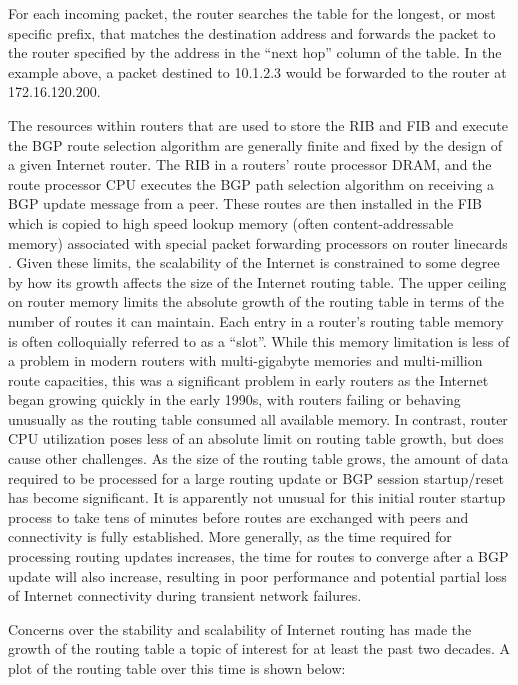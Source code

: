 For each incoming packet, the router searches the table for the longest, or
most specific prefix, that matches the destination address and forwards the
packet to the router specified by the address in the ``next hop'' column of the
table. In the example above, a packet destined to 10.1.2.3 would be forwarded
to the router at 172.16.120.200.

The resources within routers that are used to store the RIB and FIB and execute
the BGP route selection algorithm are generally finite and fixed by the design
of a given Internet router. The RIB in a routers' route processor DRAM, and the
route processor CPU executes the BGP path selection algorithm on receiving a
BGP update message from a peer. These routes are then installed in the FIB
which is copied to high speed lookup memory (often content-addressable memory)
associated with special packet forwarding processors on router linecards
\cite{Zhao:2010fu}. Given these limits, the scalability of the Internet is
constrained to some degree by how its growth affects the size of the Internet
routing table. The upper ceiling on router memory limits the absolute growth of
the routing table in terms of the number of routes it can maintain. Each entry
in a router's routing table memory is often colloquially referred to as a
``slot''. While this memory limitation is less of a problem in modern routers
with multi-gigabyte memories and multi-million route capacities, this was a
significant problem in early routers as the Internet began growing quickly in
the early 1990s, with routers failing or behaving unusually as the routing
table consumed all available memory. In contrast, router CPU utilization poses
less of an absolute limit on routing table growth, but does cause other
challenges. As the size of the routing table grows, the amount of data required
to be processed for a large routing update or BGP session startup/reset has
become significant. It is apparently not unusual for this initial router
startup process to take tens of minutes \cite{Steenbergen:2010nx} before routes
are exchanged with peers and connectivity is fully established. More generally,
as the time required for processing routing updates increases, the time for
routes to converge after a BGP update will also increase, resulting in poor
performance and potential partial loss of Internet connectivity during
transient network failures.

Concerns over the stability and scalability of Internet routing has made the
growth of the routing table a topic of interest for at least the past two
decades. A plot of the routing table over this time is shown below:

